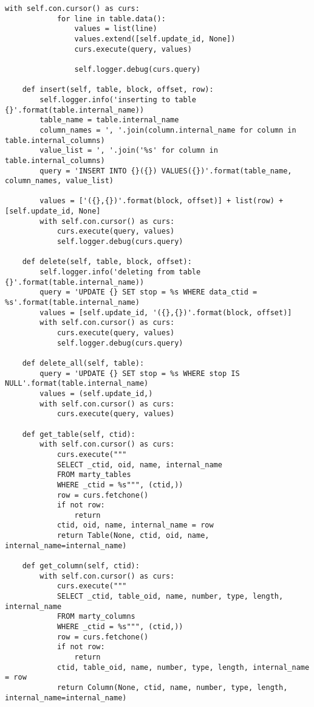 \begin{lstlisting}[caption={populator.py}]
        with self.con.cursor() as curs:
            for line in table.data():
                values = list(line)
                values.extend([self.update_id, None])
                curs.execute(query, values)

                self.logger.debug(curs.query)

    def insert(self, table, block, offset, row):
        self.logger.info('inserting to table {}'.format(table.internal_name))
        table_name = table.internal_name
        column_names = ', '.join(column.internal_name for column in table.internal_columns)
        value_list = ', '.join('%s' for column in table.internal_columns)
        query = 'INSERT INTO {}({}) VALUES({})'.format(table_name, column_names, value_list)

        values = ['({},{})'.format(block, offset)] + list(row) + [self.update_id, None]
        with self.con.cursor() as curs:
            curs.execute(query, values)
            self.logger.debug(curs.query)

    def delete(self, table, block, offset):
        self.logger.info('deleting from table {}'.format(table.internal_name))
        query = 'UPDATE {} SET stop = %s WHERE data_ctid = %s'.format(table.internal_name)
        values = [self.update_id, '({},{})'.format(block, offset)]
        with self.con.cursor() as curs:
            curs.execute(query, values)
            self.logger.debug(curs.query)

    def delete_all(self, table):
        query = 'UPDATE {} SET stop = %s WHERE stop IS NULL'.format(table.internal_name)
        values = (self.update_id,)
        with self.con.cursor() as curs:
            curs.execute(query, values)

    def get_table(self, ctid):
        with self.con.cursor() as curs:
            curs.execute("""
            SELECT _ctid, oid, name, internal_name
            FROM marty_tables
            WHERE _ctid = %s""", (ctid,))
            row = curs.fetchone()
            if not row:
                return
            ctid, oid, name, internal_name = row
            return Table(None, ctid, oid, name, internal_name=internal_name)

    def get_column(self, ctid):
        with self.con.cursor() as curs:
            curs.execute("""
            SELECT _ctid, table_oid, name, number, type, length, internal_name
            FROM marty_columns
            WHERE _ctid = %s""", (ctid,))
            row = curs.fetchone()
            if not row:
                return
            ctid, table_oid, name, number, type, length, internal_name = row
            return Column(None, ctid, name, number, type, length, internal_name=internal_name)



\end{lstlisting}
